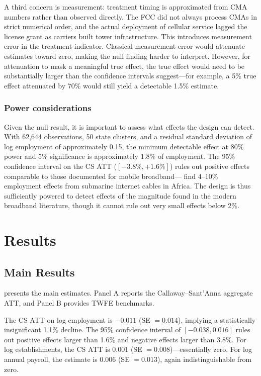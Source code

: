 \documentclass[12pt]{article}
\begin{document}
A third concern is measurement: treatment timing is approximated from CMA numbers rather than observed directly. The FCC did not always process CMAs in strict numerical order, and the actual deployment of cellular service lagged the license grant as carriers built tower infrastructure. This introduces measurement error in the treatment indicator. Classical measurement error would attenuate estimates toward zero, making the null finding harder to interpret. However, for attenuation to mask a meaningful true effect, the true effect would need to be substantially larger than the confidence intervals suggest---for example, a 5\% true effect attenuated by 70\% would still yield a detectable 1.5\% estimate.

\subsubsection*{Power considerations} Given the null result, it is important to assess what effects the design can detect. With 62,644 observations, 50 state clusters, and a residual standard deviation of log employment of approximately 0.15, the minimum detectable effect at 80\% power and 5\% significance is approximately 1.8\% of employment. The 95\% confidence interval on the CS ATT ($[-3.8\%, +1.6\%]$) rules out positive effects comparable to those documented for mobile broadband---\citet{hjort2019} find 4--10\% employment effects from submarine internet cables in Africa. The design is thus sufficiently powered to detect effects of the magnitude found in the modern broadband literature, though it cannot rule out very small effects below 2\%.

\section{Results}

\subsection{Main Results}

 presents the main estimates. Panel A reports the Callaway--Sant'Anna aggregate ATT, and Panel B provides TWFE benchmarks.

The CS ATT on log employment is $-0.011$ (SE $= 0.014$), implying a statistically insignificant 1.1\% decline. The 95\% confidence interval of $[-0.038, 0.016]$ rules out positive effects larger than 1.6\% and negative effects larger than 3.8\%. For log establishments, the CS ATT is $0.001$ (SE $= 0.008$)---essentially zero. For log annual payroll, the estimate is $0.006$ (SE $= 0.013$), again indistinguishable from zero.
\end{document}
